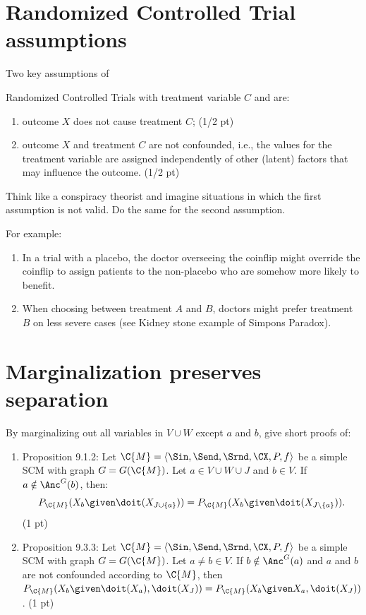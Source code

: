\section{Randomized Controlled Trial assumptions}
Two key assumptions of {Randomized Controlled Trials with treatment variable $C$ and  are:
\begin{enumerate}
	\item outcome $X$ does not cause treatment $C$; (1/2 pt)
	\item outcome $X$ and treatment $C$ are not confounded, i.e., the values for
	 the treatment variable are assigned independently of other (latent) factors that may influence
	 the outcome. (1/2 pt)
  \end{enumerate}

Think like a conspiracy theorist and imagine situations in which the first assumption is not valid. Do the same for the second assumption.

\begin{gradedsolution}
	For example:
	\begin{enumerate}
		\item In a trial with a placebo, the doctor overseeing the coinflip might override the coinflip to assign patients to the non-placebo who are somehow more likely to benefit.
		\item When choosing between treatment $A$ and $B$, doctors might prefer treatment $B$ on less severe cases (see Kidney stone example of Simpons Paradox). 
	\end{enumerate}
\end{gradedsolution}

\section{Marginalization preserves separation}
By marginalizing out all variables in $V \cup W$ except $a$ and $b$, give short proofs of:
\begin{enumerate}
	\item Proposition 9.1.2: Let $\C{M} = \langle \Sin, \Send, \Srnd, \CX, P, f \rangle$ be a simple SCM with graph $G = G(\C{M})$.
	Let $a \in V \cup W \cup J$ and $b \in V$.
	If $a \notin \Anc^G(b)$, then:
	$$P_{\C{M}}(X_b \given \doit(X_{J\cup \{a\}})) = P_{\C{M}}(X_b \given \doit(X_{J\setminus \{a\}})).$$ (1 pt)
	\item Proposition 9.3.3:  Let $\C{M} = \langle \Sin, \Send, \Srnd, \CX, P, f \rangle$ be a simple SCM with graph $G = G(\C{M})$.
	Let $a \ne b \in V$.
	If $b \notin \Anc^G(a)$ and $a$ and $b$ are not confounded according to $\C{M}$, then
	  $P_{\C{M}}(X_b \given \doit(X_a), \doit(X_J)) = P_{\C{M}}(X_b \given X_a, \doit(X_J))$. (1 pt)
\end{enumerate}

}
